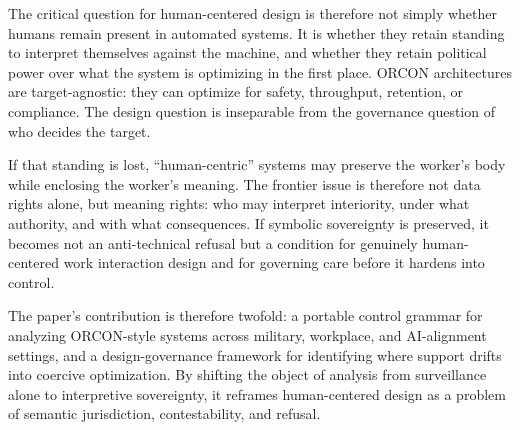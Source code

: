 \documentclass[runningheads]{llncs}
\begin{document}
The critical question for human-centered design is therefore not simply whether humans remain present in automated systems. It is whether they retain standing to interpret themselves against the machine, and whether they retain political power over what the system is optimizing in the first place. ORCON architectures are target-agnostic: they can optimize for safety, throughput, retention, or compliance. The design question is inseparable from the governance question of who decides the target.

If that standing is lost, ``human-centric'' systems may preserve the worker's body while enclosing the worker's meaning. The frontier issue is therefore not data rights alone, but meaning rights: who may interpret interiority, under what authority, and with what consequences. If symbolic sovereignty is preserved, it becomes not an anti-technical refusal but a condition for genuinely human-centered work interaction design and for governing care before it hardens into control.

The paper's contribution is therefore twofold: a portable control grammar for analyzing ORCON-style systems across military, workplace, and AI-alignment settings, and a design-governance framework for identifying where support drifts into coercive optimization. By shifting the object of analysis from surveillance alone to interpretive sovereignty, it reframes human-centered design as a problem of semantic jurisdiction, contestability, and refusal.
\end{document}
